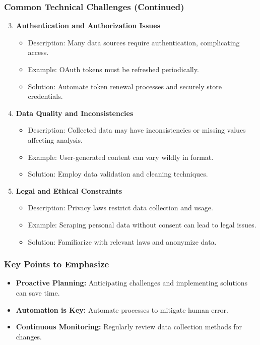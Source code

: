 \documentclass{beamer}
\begin{document}
\begin{frame}[fragile]
    \frametitle{Common Technical Challenges (Continued)}
    \begin{enumerate}
        \setcounter{enumi}{2} %
        \item \textbf{Authentication and Authorization Issues}
        \begin{itemize}
            \item Description: Many data sources require authentication, complicating access.
            \item Example: OAuth tokens must be refreshed periodically.
            \item Solution: Automate token renewal processes and securely store credentials.
        \end{itemize}
        
        \item \textbf{Data Quality and Inconsistencies}
        \begin{itemize}
            \item Description: Collected data may have inconsistencies or missing values affecting analysis.
            \item Example: User-generated content can vary wildly in format.
            \item Solution: Employ data validation and cleaning techniques.
        \end{itemize}
        
        \item \textbf{Legal and Ethical Constraints}
        \begin{itemize}
            \item Description: Privacy laws restrict data collection and usage.
            \item Example: Scraping personal data without consent can lead to legal issues.
            \item Solution: Familiarize with relevant laws and anonymize data.
        \end{itemize}
    \end{enumerate}
\end{frame}

\begin{frame}[fragile]
    \frametitle{Key Points to Emphasize}
    \begin{itemize}
        \item \textbf{Proactive Planning:} Anticipating challenges and implementing solutions can save time.
        \item \textbf{Automation is Key:} Automate processes to mitigate human error.
        \item \textbf{Continuous Monitoring:} Regularly review data collection methods for changes.
    \end{itemize}
\end{frame}
\end{document}

